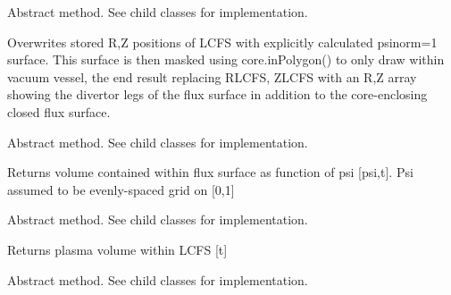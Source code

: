 \documentclass[letterpaper,10pt,english]{sphinxmanual}
\begin{document}
\begin{fulllineitems}

\begin{fulllineitems}
\label{\detokenize{eqtools:eqtools.core.Equilibrium.remapLCFS}}
Abstract method.  See child classes for implementation.

Overwrites stored R,Z positions of LCFS with explicitly calculated psinorm=1
surface.  This surface is then masked using core.inPolygon() to only draw within
vacuum vessel, the end result replacing RLCFS, ZLCFS with an R,Z array showing
the divertor legs of the flux surface in addition to the core-enclosing closed
flux surface.

\end{fulllineitems}


\begin{fulllineitems}
\label{\detokenize{eqtools:eqtools.core.Equilibrium.getFluxVol}}
Abstract method.  See child classes for implementation.

Returns volume contained within flux surface as function of psi {[}psi,t{]}.
Psi assumed to be evenly-spaced grid on {[}0,1{]}

\end{fulllineitems}


\begin{fulllineitems}
\label{\detokenize{eqtools:eqtools.core.Equilibrium.getVolLCFS}}
Abstract method.  See child classes for implementation.

Returns plasma volume within LCFS {[}t{]}

\end{fulllineitems}


\begin{fulllineitems}
\label{\detokenize{eqtools:eqtools.core.Equilibrium.getRmidPsi}}
Abstract method.  See child classes for implementation.


\end{fulllineitems}
\end{fulllineitems}
\end{document}
